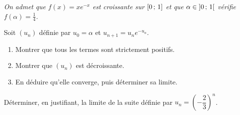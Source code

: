 \begin{annales}
\emph{On admet que $f(x) = xe^{-x}$ est croissante sur $\left[0\,;\,1\right]$ et
que $\alpha \in \left]0\,;\,1\right[$ vérifie $f(\alpha) = \frac14$.}

Soit $(u_{n})$ définie par $u_{0} = \alpha$ et
$u_{n+1} = u_{n}e^{-u_{n}}$.
\begin{enumerate}[label=\textbf{\alph*)}, leftmargin=*, itemsep=0.15em]
  \item Montrer que tous les termes sont strictement positifs.
  \item Montrer que $(u_{n})$ est décroissante.
  \item En déduire qu'elle converge, puis déterminer sa limite.
\end{enumerate}

Déterminer, en justifiant, la limite de la suite définie par
$u_{n} = \left(-\dfrac23\right)^{n}$.
\end{annales}

